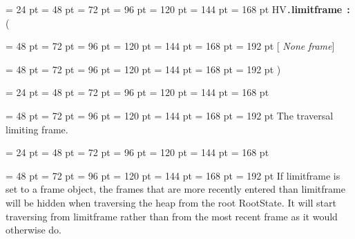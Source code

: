 {{{{\par}
\par}
\par}
{\par \noindent  \leftskip = 24 pt  \leftmargini = 48 pt  \leftmarginii = 72 pt  \leftmarginiii = 96 pt  \leftmarginiv = 120 pt  \leftmarginv = 144 pt  \leftmarginvi = 168 pt HV{\tt .\/}{\bf {\large {\bf limitframe\/}}\/}~{\bf :}  ({\par \noindent
{\par \noindent  \leftskip = 48 pt  \leftmargini = 72 pt  \leftmarginii = 96 pt  \leftmarginiii = 120 pt  \leftmarginiv = 144 pt  \leftmarginv = 168 pt  \leftmarginvi = 192 pt {\bf {}\/}{[} {\em None\/}{\bf {}\/} {\em frame\/}]\par}
{\par \noindent  \leftskip = 48 pt  \leftmargini = 72 pt  \leftmarginii = 96 pt  \leftmarginiii = 120 pt  \leftmarginiv = 144 pt  \leftmarginv = 168 pt  \leftmarginvi = 192 pt  )\par}
\par}
\par}
{\par \noindent  \leftskip = 24 pt  \leftmargini = 48 pt  \leftmarginii = 72 pt  \leftmarginiii = 96 pt  \leftmarginiv = 120 pt  \leftmarginv = 144 pt  \leftmarginvi = 168 pt {\par \noindent
{\par \noindent  \leftskip = 48 pt  \leftmargini = 72 pt  \leftmarginii = 96 pt  \leftmarginiii = 120 pt  \leftmarginiv = 144 pt  \leftmarginv = 168 pt  \leftmarginvi = 192 pt  The traversal limiting frame.\par}
\par}
\par}
{\par \noindent  \leftskip = 24 pt  \leftmargini = 48 pt  \leftmarginii = 72 pt  \leftmarginiii = 96 pt  \leftmarginiv = 120 pt  \leftmarginv = 144 pt  \leftmarginvi = 168 pt {\par \noindent
{\par \noindent  \leftskip = 48 pt  \leftmargini = 72 pt  \leftmarginii = 96 pt  \leftmarginiii = 120 pt  \leftmarginiv = 144 pt  \leftmarginv = 168 pt  \leftmarginvi = 192 pt  If limitframe is set to a frame object, the frames that are more
recently entered than limitframe will be hidden when traversing the
heap from the root RootState. It will start traversing from limitframe
rather than from the most recent frame as it would otherwise do.
\par}
\par}
\par}
\par}
